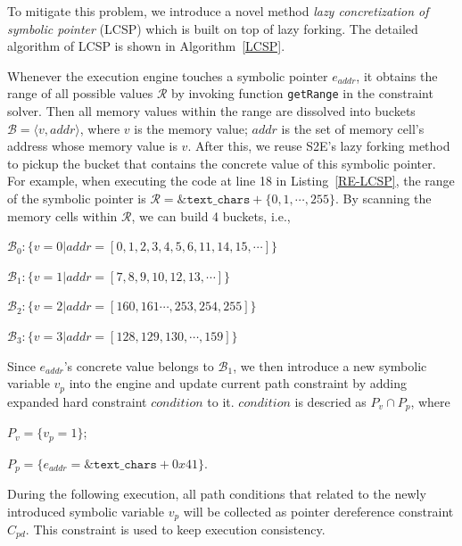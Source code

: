 To mitigate this problem, we introduce a novel method 
\emph{lazy concretization of symbolic pointer} (LCSP) 
which is built on top of lazy forking. The detailed algorithm 
of LCSP is shown in Algorithm~\ref{LCSP}.


 

Whenever the execution engine touches a symbolic pointer $e_{addr}$, it obtains 
the range of all possible values $\mathcal{R}$ by invoking function \texttt{getRange} 
in the constraint solver. Then all memory values within the range are dissolved
into buckets $\mathcal{B}=\langle v, addr\rangle$, where $v$ is the memory value; $addr$
is the set of memory cell's address whose memory value is $v$.
After this, we reuse S2E's lazy forking method to pickup 
the bucket that contains the concrete value of this symbolic pointer.
For example, when executing the code at line 18 in Listing~\ref{RE-LCSP}, the range of 
the symbolic pointer is $\mathcal{R}=\texttt{\&text\_chars}+\{0, 1,\cdots, 255\}$.
By scanning the memory cells within $\mathcal{R}$, we can build 4 buckets, i.e., 

$\mathcal{B}_0:\{v=0| addr=[0,1,2,3,4,5,6,11,14,15,\cdots]\}$

$\mathcal{B}_1:\{v=1| addr=[7,8,9,10,12,13,\cdots]\}$

$\mathcal{B}_2:\{v=2| addr=[160,161\cdots, 253,254,255]\}$

$\mathcal{B}_3:\{v=3| addr=[128,129,130,\cdots,159]\}$

Since $e_{addr}$'s concrete value belongs to $\mathcal{B}_1$, we then
introduce a new symbolic variable $v_p$ into the engine and update current path constraint by adding expanded hard constraint $condition$ to it. 
$condition$ is descried as $P_v\cap P_p$, where


$P_v=\{v_p=1\}$; 

$P_p=\{e_{addr}=\&\texttt{text\_chars}+0x41\}$.

During the following execution, all path conditions that related to the newly
introduced symbolic variable $v_p$ will be collected as pointer dereference constraint
$C_{pd}$.
This constraint is used to keep execution consistency.

